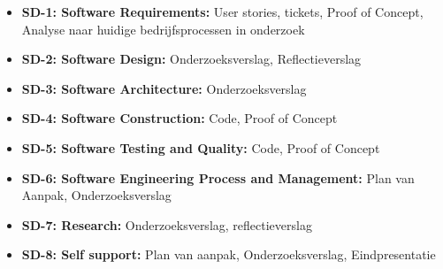 \begin{itemize}
  \item \textbf{SD-1: Software Requirements:} User stories, tickets, Proof of Concept, Analyse naar huidige bedrijfsprocessen in onderzoek
  \item \textbf{SD-2: Software Design:} Onderzoeksverslag, Reflectieverslag
  \item \textbf{SD-3: Software Architecture:} Onderzoeksverslag
  \item \textbf{SD-4: Software Construction:} Code, Proof of Concept
  \item \textbf{SD-5: Software Testing and Quality:} Code, Proof of Concept
  \item \textbf{SD-6: Software Engineering Process and Management:}  Plan van Aanpak, Onderzoeksverslag
  \item \textbf{SD-7: Research:} Onderzoeksverslag, reflectieverslag
  \item \textbf{SD-8: Self support:} Plan van aanpak, Onderzoeksverslag, Eindpresentatie
\end{itemize}

